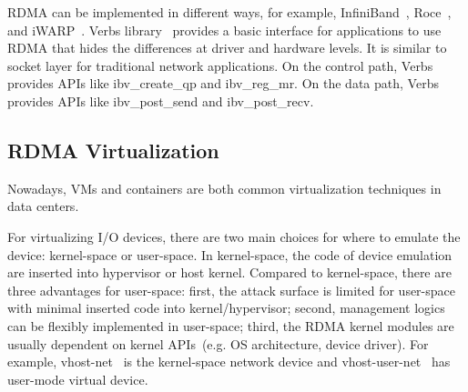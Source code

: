 RDMA can be implemented in different ways, for example, InfiniBand~\cite{infiniband}, Roce~\cite{roce}, and iWARP~\cite{iwarp}. Verbs library~\cite{verbs} provides a basic interface for applications to use RDMA that hides the differences at driver and hardware levels. It is similar to socket layer for traditional network applications. On the control path, Verbs provides APIs like ibv\_create\_qp and ibv\_reg\_mr. On the data path, Verbs provides APIs like ibv\_post\_send and ibv\_post\_recv.



\subsection{RDMA Virtualization}
Nowadays, VMs and containers are both common virtualization techniques in data centers. 

For virtualizing I/O devices, there are two main choices for where to emulate the device: kernel-space or user-space. In kernel-space, the code of device emulation are inserted into hypervisor or host kernel. Compared to kernel-space, there are three advantages for user-space: first, the attack surface is limited for user-space with minimal inserted code into kernel/hypervisor; second, management logics can be flexibly implemented in user-space; third, the RDMA kernel modules are usually dependent on kernel APIs~(e.g. OS architecture, device driver). For example, vhost-net~\cite{vhost-net} is the kernel-space network device and vhost-user-net~\cite{vhost-user-net} has user-mode virtual device.